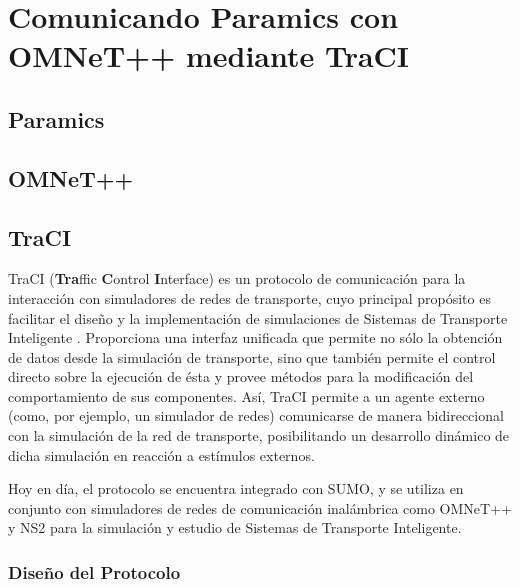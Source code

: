\chapter{Comunicando Paramics con OMNeT++ mediante TraCI}

\section{Paramics}
\section{OMNeT++}
\section{TraCI}
TraCI (\textbf{Tra}ffic \textbf{C}ontrol \textbf{I}nterface) es un protocolo de comunicación para la interacción con simuladores de redes de transporte, cuyo principal propósito es facilitar el diseño y la implementación de simulaciones de Sistemas de Transporte Inteligente \cite{traci}. Proporciona una interfaz unificada que permite no sólo la obtención de datos desde la simulación de transporte, sino que también permite el control directo sobre la ejecución de ésta y provee métodos para la modificación del comportamiento de sus componentes. Así, TraCI permite a un agente externo (como, por ejemplo, un simulador de redes) comunicarse de manera bidireccional con la simulación de la red de transporte, posibilitando un desarrollo dinámico de dicha simulación en reacción a estímulos externos.

Hoy en día, el protocolo se encuentra integrado con SUMO, y se utiliza en conjunto con simuladores de redes de comunicación inalámbrica como OMNeT++ y NS2 para la simulación y estudio de Sistemas de Transporte Inteligente.

\subsection{Diseño del Protocolo}

